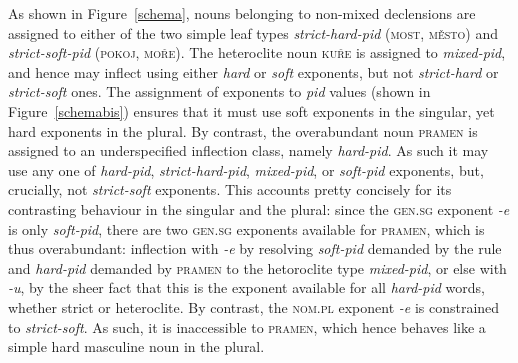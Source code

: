 \documentclass[output=paper]{langsci/langscibook}
\begin{document}

As shown in Figure~\ref{schema}, nouns belonging to non-mixed
declensions are assigned to either of the two simple leaf types
\emph{strict-hard-pid} (\textsc{most, město}) and
\emph{strict-soft-pid} (\textsc{pokoj, moře}). The heteroclite noun
\textsc{kuře} is assigned to \emph{mixed-pid}, and hence may inflect
using either \emph{hard} or \emph{soft} exponents, but not
\emph{strict-hard} or \emph{strict-soft} ones. The assignment of
exponents to \emph{pid} values (shown in Figure~\ref{schemabis})  ensures that it must use soft exponents in the
  singular, yet hard exponents in the plural. By contrast, the
overabundant noun \textsc{pramen} is assigned to an underspecified
inflection class, namely \emph{hard-pid}. As such it may use any
one of \emph{hard-pid}, \emph{strict-hard-pid},
\emph{mixed-pid}, or \emph{soft-pid} exponents, but, crucially, not
\emph{strict-soft} exponents. This accounts pretty concisely
for its contrasting behaviour in the singular and the plural: since
the \textsc{gen.sg} exponent \emph{-e} is only \emph{soft-pid}, there
are two \textsc{gen.sg} exponents available for \textsc{pramen}, which
is thus overabundant: inflection with \textit{-e} by resolving
\textit{soft-pid} demanded by the rule and \textit{hard-pid} demanded
by \textsc{pramen} to the hetoroclite type \textit{mixed-pid}, or else
with \textit{-u}, by the sheer fact that this is the exponent
available for all \textit{hard-pid} words, whether strict or
heteroclite. By contrast, the \textsc{nom.pl} exponent \emph{-e} is
constrained to \emph{strict-soft}. As such, it is inaccessible to
\textsc{pramen}, which hence behaves like a simple hard masculine noun
in the plural.
\end{document}
